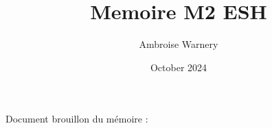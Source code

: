 \documentclass[a4paper,12pt,twoside,french]{book}
\title{Memoire M2 ESH}
\author{Ambroise Warnery}
\date{October 2024}
\begin{document}
\printglossary

Document brouillon du mémoire :
\end{document}
